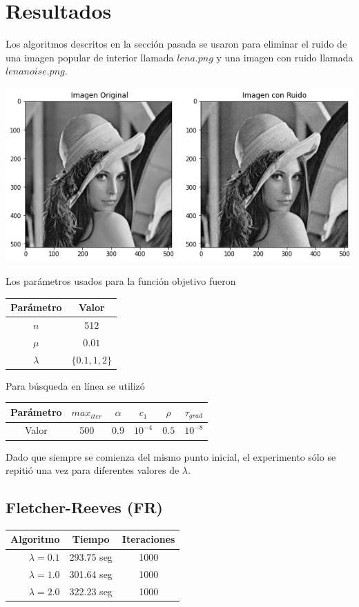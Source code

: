 \documentclass[11pt,letterpaper]{article}
\theoremstyle{definition}
\theoremstyle{definition}
\theoremstyle{definition}
\begin{document}
\section{Resultados}
Los algoritmos descritos en la sección pasada se usaron para eliminar el ruido de una imagen popular de interior llamada $ lena.png $ y una imagen con ruido llamada $ lenanoise.png $.
\begin{center}
	\includegraphics[width=0.7\linewidth]{graficas/lena}
\end{center}

Los parámetros usados para la función objetivo fueron
\begin{center}
	\begin{tabular}{cc}
		\hline
		Parámetro & Valor \\
		\hline
		$n $ & 512 \\
		$ \mu $  & $ 0.01 $ \\
		$ \lambda $ & $ \{ 0.1, 1, 2 \} $ \\
		\hline
	\end{tabular}
\end{center}
Para búsqueda en línea se utilizó
\begin{center}
	\begin{tabular}{cccccc}
		\hline
		Parámetro & $ max_{iter} $ & $ \alpha $ & $ c_1 $ & $ \rho $ & $ \tau_{grad} $ \\
		\hline
		 Valor    &      500     & $ 0.9 $ & $ 10^{-4} $ & $ 0.5 $ &$ 10^{-8} $  \\
		\hline
	\end{tabular}
\end{center}
Dado que siempre se comienza del mismo punto inicial, el experimento sólo se repitió una vez para diferentes valores de $ \lambda $. 
\subsection{Fletcher-Reeves (FR)}
\begin{center}
	\begin{tabular}{rcc}
		\hline
		\hline
		Algoritmo          & Tiempo       & Iteraciones \\
		\hline
		\hline
		$ \lambda = 0.1 $ & 293.75 seg &    1000         \\
		$ \lambda = 1.0 $ & 301.64 seg &    1000         \\
		$ \lambda = 2.0 $ & 322.23 seg &    1000          \\
		\hline
	\end{tabular}
\end{center}
\end{document}

